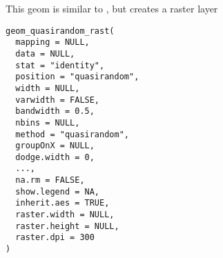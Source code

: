 \documentclass[a4paper]{book}
\begin{document}
%
\begin{Description}\relax
This geom is similar to , but creates a raster layer
\end{Description}
%
\begin{Usage}
\begin{verbatim}
geom_quasirandom_rast(
  mapping = NULL,
  data = NULL,
  stat = "identity",
  position = "quasirandom",
  width = NULL,
  varwidth = FALSE,
  bandwidth = 0.5,
  nbins = NULL,
  method = "quasirandom",
  groupOnX = NULL,
  dodge.width = 0,
  ...,
  na.rm = FALSE,
  show.legend = NA,
  inherit.aes = TRUE,
  raster.width = NULL,
  raster.height = NULL,
  raster.dpi = 300
)
\end{verbatim}
\end{Usage}
%
\end{document}
